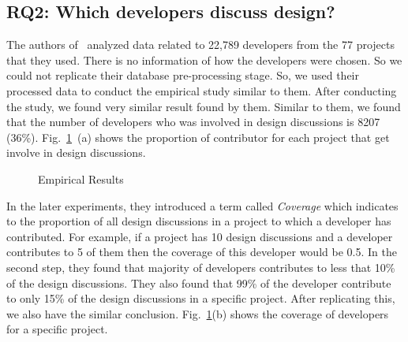 \subsection{RQ2: Which developers discuss design?}
The authors of~\cite{Brunet2014a} analyzed data related to 22,789 developers from the 77 projects that they used. There is no information of how the developers were chosen. So we could not replicate their database pre-processing stage. So, we used their processed data to conduct the empirical study similar to them. After conducting the study, we found very similar result found by them. Similar to them, we found that the number of developers who was involved in design discussions is 8207 (36\%). Fig.~\ref{fig:rq_2}~(a) shows the proportion of contributor for each project that get involve in design discussions.
\begin{figure}[h!]
	\hfill
	\hfill
	\caption{Empirical Results}
	\label{fig:rq_2}
\end{figure}

In the later experiments, they introduced a term called \emph{Coverage} which indicates to the proportion of all design discussions in a project to which a developer has contributed. For example, if a project has 10 design discussions and a developer contributes to 5 of them then the coverage of this developer would be 0.5. In the second step, they found that majority of developers contributes to less that 10\% of the design discussions. They also found that 99\% of the developer contribute to only 15\% of the design discussions in a specific project. After replicating this, we also have the similar conclusion. Fig.~\ref{fig:rq_2}(b) shows the coverage of developers for a specific project.

